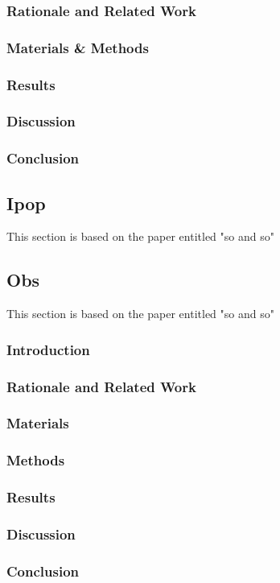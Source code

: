 \subsubsection{Rationale and Related Work}

\subsubsection{Materials \& Methods}


\subsubsection{Results}

\subsubsection{Discussion}

\subsubsection{Conclusion}



\subsection{Ipop}\label{subsec:ipop}
This section is based on the paper entitled "so and so"

%

\subsection{Obs}\label{subsec:obs}
This section is based on the paper entitled "so and so"

\subsubsection{Introduction}

\subsubsection{Rationale and Related Work}

\subsubsection{Materials}

\subsubsection{Methods}

\subsubsection{Results}

\subsubsection{Discussion}

\subsubsection{Conclusion}







